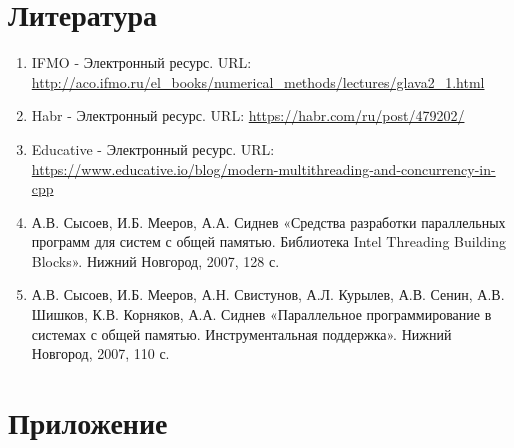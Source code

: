 \documentclass{report}
\begin{document}
\section*{Литература}
\begin{enumerate}
\item IFMO - Электронный ресурс. URL: \newline \url{http://aco.ifmo.ru/el_books/numerical_methods/lectures/glava2_1.html}
\item Habr - Электронный ресурс. URL: \newline \url{https://habr.com/ru/post/479202/}
\item Educative - Электронный ресурс. URL: \newline \url{https://www.educative.io/blog/modern-multithreading-and-concurrency-in-cpp}
\item А.В. Сысоев, И.Б. Мееров, А.А. Сиднев «Средства разработки параллельных программ для систем с общей памятью. Библиотека Intel Threading Building Blocks». Нижний Новгород, 2007, 128 с. 
\item А.В. Сысоев, И.Б. Мееров, А.Н. Свистунов, А.Л. Курылев, А.В. Сенин, А.В. Шишков, К.В. Корняков, А.А. Сиднев «Параллельное программирование в системах с общей
памятью. Инструментальная поддержка». Нижний Новгород, 2007, 110 с. 
\end{enumerate}


\newpage

\section*{Приложение}
\end{document}

